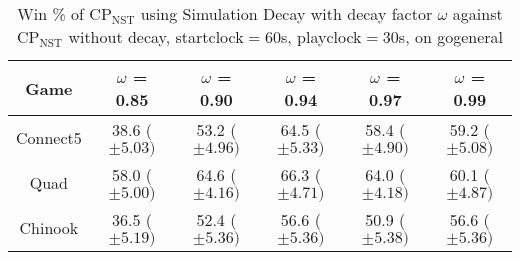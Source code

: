 \documentclass[journal]{IEEEtran}
\begin{document}
\begin{table*}[t]
\caption{Win \% of CP$_{\textrm{NST}}$ using Simulation Decay with decay factor $\omega$ against CP$_{\textrm{NST}}$ without decay, startclock$=$60s, playclock$=$30s, on gogeneral}
\label{table:experimentSimulationDecayKappa}
\centering
\begin{tabular}{|c|c|c|c|c|c|}
\hline
	\textbf{Game}  & \textbf{$\omega$} = 0.85 & \textbf{$\omega$} = 0.90 & \textbf{$\omega$} = 0.94 & \textbf{$\omega$} = 0.97 & \textbf{$\omega$} = 0.99\\
\hline \hline

Connect5  & 38.6 ($\pm 5.03)$ & 53.2 ($\pm 4.96)$ & 64.5 ($\pm 5.33)$ & 58.4 ($\pm 4.90)$ & 59.2 ($\pm 5.08)$\\ 
Quad  & 58.0 ($\pm 5.00)$ & 64.6 ($\pm 4.16)$ & 66.3 ($\pm 4.71)$ & 64.0 ($\pm 4.18)$ & 60.1 ($\pm 4.87)$\\ 
Chinook & 36.5 ($\pm 5.19)$ & 52.4 ($\pm 5.36)$ & 56.6 ($\pm 5.36)$ & 50.9 ($\pm 5.38)$ & 56.6 ($\pm 5.36)$\\ 
 \hline 

\end{tabular}
\end{table*}

\end{document}

